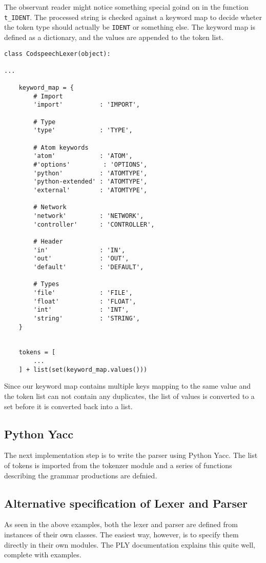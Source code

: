 The observant reader might notice something special goind on in the
function \texttt{t_IDENT}. The processed string is checked against a
keyword map to decide wheter the token type should actually be
\texttt{IDENT} or something else. The keyword map is defined as a
dictionary, and the values are appended to the token list.
\begin{lstlisting}
class CodspeechLexer(object):

...

    keyword_map = {
        # Import
        'import'          : 'IMPORT',

        # Type
        'type'            : 'TYPE',

        # Atom keywords
        'atom'            : 'ATOM',
        #'options'         : 'OPTIONS',
        'python'          : 'ATOMTYPE',
        'python-extended' : 'ATOMTYPE',
        'external'        : 'ATOMTYPE',

        # Network
        'network'         : 'NETWORK',
        'controller'      : 'CONTROLLER',
                
        # Header
        'in'              : 'IN',
        'out'             : 'OUT',
        'default'         : 'DEFAULT',
        
        # Types
        'file'            : 'FILE',
        'float'           : 'FLOAT',
        'int'             : 'INT',
        'string'          : 'STRING',
    }


    tokens = [
        ...
    ] + list(set(keyword_map.values()))
\end{lstlisting}

\noindent Since our keyword map contains multiple keys mapping to the
same value and the token list can not contain any duplicates, the list
of values is converted to a set before it is converted back into a
list.


\subsection{Python Yacc}
The next implementation step is to write the parser using Python
Yacc. The list of tokens is imported from the tokenzer module and a
series of functions describing the grammar productions are defnied.


\subsection{Alternative specification of Lexer and Parser}
As seen in the above examples, both the lexer and parser are defined
from instances of their own classes. The easiest way, however, is to
specify them directly in their own modules. The PLY documentation
explains this quite well, complete with examples. \citep{ply:online}

